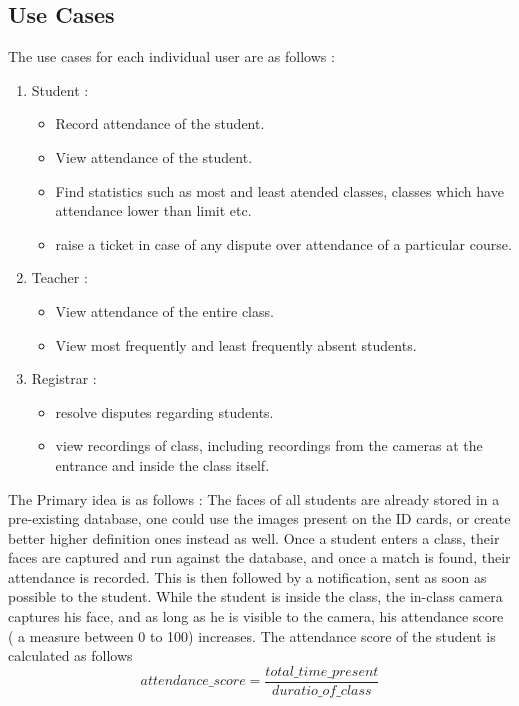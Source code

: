 \documentclass[conference]{IEEEtran}
\begin{document}
\subsection{Use Cases}
The use cases for each individual user are as follows :
\begin{enumerate}
    \item Student :
        \begin{itemize}
            \item Record attendance of the student.
            \item View attendance of the student.
            \item Find statistics such as most and least atended classes, classes which have attendance lower than limit etc.
            \item raise a ticket in case of any dispute over attendance of a particular course.
        \end{itemize}
    \item Teacher :
        \begin{itemize}
            \item View attendance of the entire class.
            \item View most frequently and least frequently absent students.
        \end{itemize}
    \item Registrar :
        \begin{itemize}
            \item resolve disputes regarding students.
            \item view recordings of class, including recordings from the cameras at the entrance and inside the class itself.
        \end{itemize}
\end{enumerate}
The Primary idea is as follows : The faces of all students are already stored in a pre-existing database, one could use the images present on the ID cards, or create better higher definition ones instead as well. Once a student enters
a class, their faces are captured and run against the database, and once a match is found, their attendance is recorded. This is then followed by a notification, sent as soon as possible to the student. While the student is inside the class, the in-class camera captures his face, and as long as he is visible to the
camera, his attendance score ( a measure between 0 to 100) increases. The attendance score of the student is calculated as follows
\begin{equation}
    attendance\_score=\frac{total\_time\_present}{duratio\_of\_class}
\end{equation}
\end{document}
